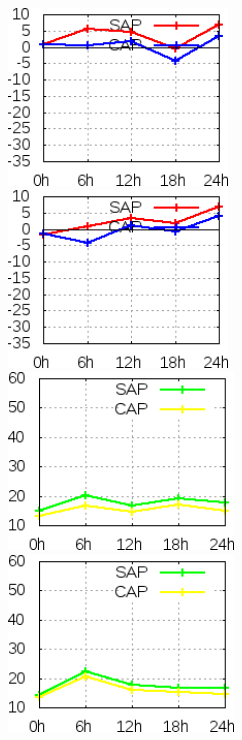 \begin{figure}[!hbp]
\centering
\includegraphics[height=4.7cm]{./figs/VIES850zgeo0Z.png}\vspace{1.0cm}\hspace{1.0cm}\includegraphics[height=4.7cm]{./figs/VIES850zgeo12Z.png}
\includegraphics[height=4.7cm]{./figs/EQM850zgeo0Z.png}\vspace{1.0cm}\hspace{1.0cm}\includegraphics[height=4.7cm]{./figs/EQM850zgeo12Z.png}

\end{figure}
